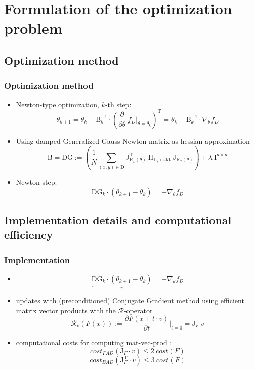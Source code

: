 


\beamertemplatenavigationsymbolsempty{}


\section{Formulation of the optimization problem}

  \subsection{Optimization method}
  \begin{frame}
  \frametitle{Optimization method}
  \begin{itemize}
  	\item Newton-type optimization, $k$-th step: 
  	$$\theta_{k+1} = \theta_{k} - \mathrm{B}_{k}^{-1}\cdot\left(\frac{\partial}{\partial \theta}\:f_{D}\bigg\vert_{\theta = \theta_{k}}\right)^{\mathrm{T}} = \theta_{k} - \mathrm{B}_{k}^{-1}\cdot\nabla_{\theta} f_{D}$$
  	\pause
  	\item Using damped Generalized Gauss Newton matrix as hessian approximation
  	$$\mathrm{B} = \mathrm{DG} := \left(\frac{1}{N}\sum_{(x, y)\in\mathrm{D}}^{}\mathrm{J}_{\mathrm{R}_{x}(\theta)}^{\mathrm{T}}\:\mathrm{H}_{\mathrm{L_{y}\circ\:\text{akt}}}\:\mathrm{J}_{\mathrm{R}_{x}(\theta)}\right) + \lambda\:\mathrm{I}^{d\times d} $$
  	\item[] Newton step:
  	$$\mathrm{DG}_{k}\cdot (\theta_{k+1} - \theta_{k}) = -\nabla_{\theta}f_{D}$$
  \end{itemize}
\end{frame}

\subsection{Implementation details and computational efficiency}
\begin{frame}
\frametitle{Implementation}
\begin{itemize}
	\item[] $$\underbrace{\mathrm{DG}_{k}\cdot (\theta_{k+1} - \theta_{k})} = -\nabla_{\theta}f_{D}$$
	\item updates with (preconditioned) Conjugate Gradient method using efficient matrix vector products with the $\mathcal{R}$-operator
	$$\mathcal{R}_{v}(F(x)) := \frac{\partial F(x + t\cdot v)}{\partial t}\bigg\vert_{t = 0} = \mathrm{J}_{F}\: v $$
	\pause
	\item computational costs for computing mat-vec-prod :
	$$cost_{FAD}(\mathrm{J}_{F}\cdot v)\leq 2\:cost(F)$$
	$$cost_{BAD}(\mathrm{J}_{F}^{\mathrm{T}}\cdot v)\leq 3\:cost(F)$$
\end{itemize}
\end{frame}
  
